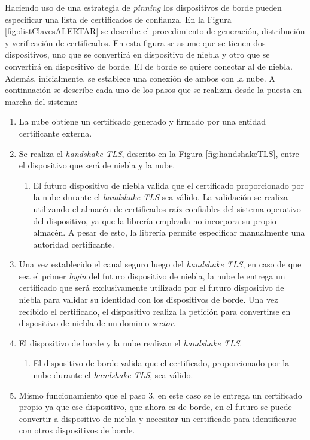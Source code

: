 Haciendo uso de una estrategia de \textit{pinning} los dispositivos de borde pueden especificar una lista de certificados de confianza. En la Figura \ref{fig:distClavesALERTAR} se describe el procedimiento de generación, distribución y verificación de certificados. En esta figura se asume que se tienen dos dispositivos, uno que se convertirá en dispositivo de niebla y otro que se convertirá en dispositivo de borde. El de borde se quiere conectar al de niebla. Además, inicialmente, se establece una conexión de ambos con la nube. A continuación se describe cada uno de los pasos que se realizan desde la puesta en marcha del sistema:
\begin{enumerate}
    \item La nube obtiene un certificado generado y firmado por una entidad certificante externa.
    \item Se realiza el \textit{handshake TLS}, descrito en la Figura \ref{fig:handshakeTLS}, entre el dispositivo que será de niebla y la nube. 
    \begin{enumerate}[2.1]
        \item El futuro dispositivo de niebla valida que el certificado proporcionado por la nube durante el \textit{handshake TLS} sea válido. La validación se realiza utilizando el almacén de certificados raíz confiables del sistema operativo del dispositivo, ya que la librería empleada no incorpora su propio almacén. A pesar de esto, la librería permite especificar manualmente una autoridad certificante.
    \end{enumerate}
    \item Una vez establecido el canal seguro luego del \textit{handshake  TLS}, en caso de que sea el primer \textit{login} del futuro dispositivo de niebla, la nube le entrega un certificado que será exclusivamente utilizado por el futuro dispositivo de niebla para validar su identidad con los dispositivos de borde. Una vez recibido el certificado, el dispositivo realiza la petición para convertirse en dispositivo de niebla de un dominio \textit{sector}.
    \item El dispositivo de borde y la nube realizan el \textit{handshake TLS}.
    \begin{enumerate}[4.1]
        \item El dispositivo de borde valida que el certificado, proporcionado por la nube durante el \textit{handshake TLS}, sea válido.
    \end{enumerate}
    \item Mismo funcionamiento que el paso 3, en este caso se le entrega un certificado propio ya que ese dispositivo, que ahora es de borde, en el futuro se puede convertir a dispositivo de niebla y necesitar un certificado para identificarse con otros dispositivos de borde.

\end{enumerate}
